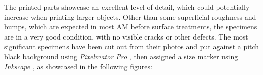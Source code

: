 \documentclass{article}
\begin{document}
        The printed parts showcase an excellent level of detail, which could potentially increase when printing larger objects. 
        Other than some superficial roughness and bumps, which are expected
        in most AM before surface treatments, the specimens are in a very good condition, with no visible cracks or other defects.
        The most significant specimens have been cut out from their photos and put against a pitch black background
        using \textit{Pixelmator Pro} \autocites{Pixelmator_Pro}, then assigned a size marker using \textit{Inkscape}
        \autocites{Inkscape}, as showcased in the following figures: 

\end{document}
